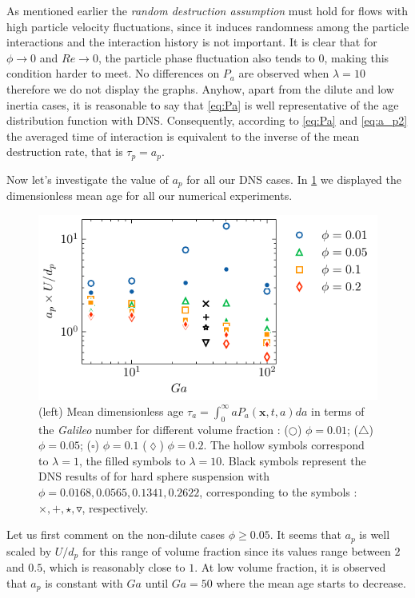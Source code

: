 As mentioned earlier the \textit{random destruction assumption} must hold for flows with high particle velocity fluctuations, since it induces randomness among the particle interactions \citep{zhang2023evolution} and the interaction history is not important.  
It is clear that for $\phi \to 0$ and $Re \to 0$, the particle phase fluctuation also tends to $0$, making this condition harder to meet. 
No differences on $P_a$ are observed when $\lambda = 10 $ therefore we do not display the graphs. 
Anyhow, apart from the dilute and low inertia cases, it is reasonable to say that \ref{eq:Pa} is well representative of the age distribution function with DNS.
Consequently, according to \ref{eq:Pa} and \ref{eq:a_p2} the averaged time of interaction is equivalent to the inverse of the mean destruction rate, that is $\tau_p = a_p$. 

Now let's investigate the value of $a_p$ for all our DNS cases. 
In \ref{fig:tau_p} we displayed the dimensionless mean age for all our numerical experiments. 
\begin{figure}[h!]
    \centering
    \includegraphics[height = 0.3\textwidth]{image/HOMOGENEOUS_NEW/PA/age.pdf}
    \caption{
    (left) Mean dimensionless age $\tau_a =  \int_0^\infty aP_a(\textbf{x},t,a)da$ in terms of the \textit{Galileo} number for different volume fraction :   
    ($\pmb\bigcirc$) $\phi = 0.01$; ($\pmb\triangle$) $ \phi = 0.05$; ($\pmb\square$) $\phi = 0.1$ ($\pmb\lozenge$) $\phi = 0.2$.
    The hollow symbols correspond to $\lambda = 1$, the filled symbols to $\lambda = 10$.
    Black symbols represent the DNS results of \citet{zhang2023evolution} for hard sphere suspension with $\phi = 0.0168,0.0565,0.1341,0.2622$, corresponding to the symbols : $\pmb\times, \pmb +, \pmb\star , \pmb\triangledown$, respectively.
    }
    \label{fig:tau_p}
\end{figure}
Let us first comment on the non-dilute cases $\phi\geq 0.05$. 
It seems that $a_p$ is well scaled by $U/d_p$ for this range of volume fraction since its values range between $2$ and $0.5$, which is reasonably close to $1$. 
At low volume fraction, it is observed that $a_p$ is constant with $Ga$ until $Ga = 50$ where the mean age starts to decrease. 


